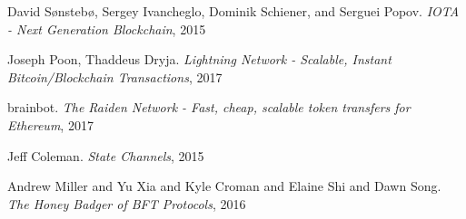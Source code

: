 \documentclass[UTF8, 10pt, nonatbib, nocopyrightspace, reprint]{sigplanconf}
\begin{document}
\begin{thebibliography}{10}
    David Sønstebø, Sergey Ivancheglo, Dominik Schiener, and Serguei Popov.
    \emph{IOTA - Next Generation Blockchain}, 2015

    Joseph Poon, Thaddeus Dryja.
    \emph{Lightning Network - Scalable, Instant Bitcoin/Blockchain Transactions}, 2017

    brainbot.
    \emph{The Raiden Network - Fast, cheap, scalable token transfers for Ethereum}, 2017

    Jeff Coleman.
    \emph{State Channels}, 2015

    Andrew Miller and Yu Xia and Kyle Croman and Elaine Shi and Dawn Song.
    \emph{The Honey Badger of BFT Protocols}, 2016

\end{thebibliography}
\end{document}

